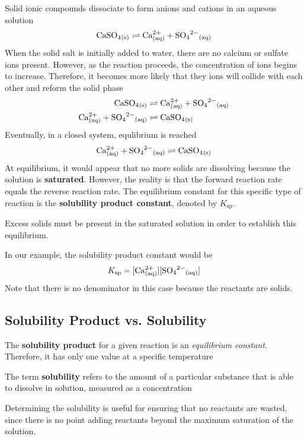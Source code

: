 Solid ionic compounds dissociate to form anions and cations in an aqueous solution
\[
    \ch{CaSO4_{(s)}}\rightleftharpoons \ch{Ca^{2+}_{(aq)}}+\ch{SO4^{2-}_{(aq)}}
\]
When the solid salt is initially added to water, there are no calcium or sulfate ions present.
However, as the reaction proceeds, the concentration of ions begins to increase. Therefore, it
becomes more likely that they ions will collide with each other and reform the solid phase
\begin{align*}
    \ch{CaSO4_{(s)}}&\rightleftharpoons \ch{Ca^{2+}_{(aq)}}+\ch{SO4^{2-}_{(aq)}}\\
    \ch{Ca^{2+}_{(aq)}}+\ch{SO4^{2-}_{(aq)}}&\rightleftharpoons \ch{CaSO4_{(s)}}
\end{align*}
Eventually, in a closed system, equlibrium is reached
\[
    \ch{Ca^{2+}_{(aq)}}+\ch{SO4^{2-}_{(aq)}}\rightleftharpoons \ch{CaSO4_{(s)}}
\]
At equilibrium, it would appear that no more solids are dissolving because the solution is
\textbf{saturated}. However, the reality is that the forward reaction rate equals the reverse
reaction rate. The equilibrium constant for this specific type of reaction is the \textbf{solubility
product constant}, denoted by $K_\mathrm{sp}$.

\begin{important}
    Excess solids must be present in the saturated solution in order to establish this equilibrium.
\end{important}

In our example, the solubility product constant would be 
\[
    K_\mathrm{sp}=[\ch{Ca^{2+}_{(aq)}}][\ch{SO4^{2-}_{(aq)}}]
\]
Note that there is no denominator in this case because the reactants are solids.

\subsection{Solubility Product vs. Solubility}
\begin{bulleted-list}
    \item The \textbf{solubility product} for a given reaction is an \textit{equilibrium constant}.
        Therefore, it has only one value at a specific temperature
    \item The term \textbf{solubility} refers to the amount of a particular substance that is
        able to dissolve in solution, measured as a concentration
\end{bulleted-list}

\begin{important}
    Determining the solubility is useful for ensuring that no reactants are wasted, since there
    is no point adding reactants beyond the maximum saturation of the solution.
\end{important}

